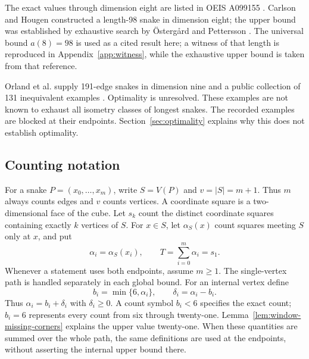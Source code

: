 \documentclass[11pt,a4paper]{article}
\theoremstyle{definition}
\theoremstyle{remark}
\begin{document}
The exact values through dimension eight are listed in OEIS A099155 \cite{oeis}. Carlson and Hougen constructed a length-98 snake in dimension eight; the upper bound was established by exhaustive search by Östergård and Pettersson \cite{ostergard}. The universal bound $a(8)=98$ is used as a cited result here; a witness of that length is reproduced in Appendix~\ref{app:witness}, while the exhaustive upper bound is taken from that reference.

Orland et al. supply 191-edge snakes in dimension nine and a public collection of 131 inequivalent examples \cite{orland,data}. Optimality is unresolved. These examples are not known to exhaust all isometry classes of longest snakes. The recorded examples are blocked at their endpoints. Section~\ref{sec:optimality} explains why this does not establish optimality.

\subsection{Counting notation}
For a snake $P=(x_0,\ldots,x_m)$, write $S=V(P)$ and $v=|S|=m+1$. Thus $m$ always counts edges and $v$ counts vertices. A coordinate square is a two-dimensional face of the cube. Let $s_k$ count the distinct coordinate squares containing exactly $k$ vertices of $S$. For $x\in S$, let $\alpha_S(x)$ count squares meeting $S$ only at $x$, and put
\[
\alpha_i=\alpha_S(x_i),\qquad T=\sum_{i=0}^{m}\alpha_i=s_1.
\]
Whenever a statement uses both endpoints, assume $m\ge1$. The single-vertex path is handled separately in each global bound.
For an internal vertex define
\[
b_i=\min\{6,\alpha_i\},\qquad \delta_i=\alpha_i-b_i.
\]
Thus $\alpha_i=b_i+\delta_i$ with $\delta_i\ge0$. A count symbol $b_i<6$ specifies the exact count; $b_i=6$ represents every count from six through twenty-one. Lemma~\ref{lem:window-missing-corners} explains the upper value twenty-one. When these quantities are summed over the whole path, the same definitions are used at the endpoints, without asserting the internal upper bound there.
\end{document}
